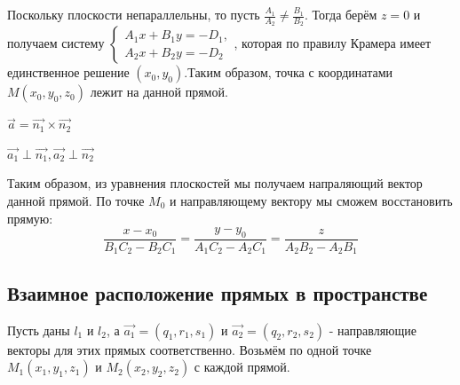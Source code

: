 \documentclass[a4paper]{article}
\begin{document}
\begin{hproof}
        Поскольку плоскости непараллельны, то пусть $\displaystyle \frac{A_1}{A_2} \neq \frac{B_1}{B_2}$. Тогда берём $z=0$ и получаем систему $\begin{cases}
                                                                                                                                                    A_1x+B_1y=-D_1,
                                                                                                                                                    \\
                                                                                                                                                    A_2x+B_2y=-D_2
        \end{cases}$, которая по правилу Крамера имеет единственное решение $(x_0, y_0)$.\newline Таким образом, точка с координатами $M(x_0, y_0, z_0)$ лежит на данной прямой.

        $\vec{a} = \vec{n_1} \times \vec{n_2}$

        $\vec{a_1} \perp \vec{n_1}, \vec{a_2} \perp \vec{n_2}$

        Таким образом, из уравнения плоскостей мы получаем напраляющий вектор данной прямой. По точке $M_0$ и направляющему вектору мы сможем восстановить прямую:
        \begin{equation}
            \displaystyle \frac{x-x_0}{B_1C_2-B_2C_1} = \frac{y-y_0}{A_1C_2-A_2C_1} = \frac{z}{A_2B_2-A_2B_1}
        \end{equation}
    \end{hproof}

    \newpage \begin{center}
                 \begin{Large}
                 \end{Large}
    \end{center}
    \subsection*{Взаимное расположение прямых в пространстве}
    Пусть даны $l_1$ и $l_2$, а $\vec{a_1} = (q_1, r_1, s_1)$ и $\vec{a_2} = (q_2, r_2, s_2)$ - направляющие векторы для этих прямых соответственно. Возьмём по одной точке $M_1(x_1, y_1, z_1)$ и $M_2(x_2, y_2, z_2)$ с каждой прямой.
\end{document}
